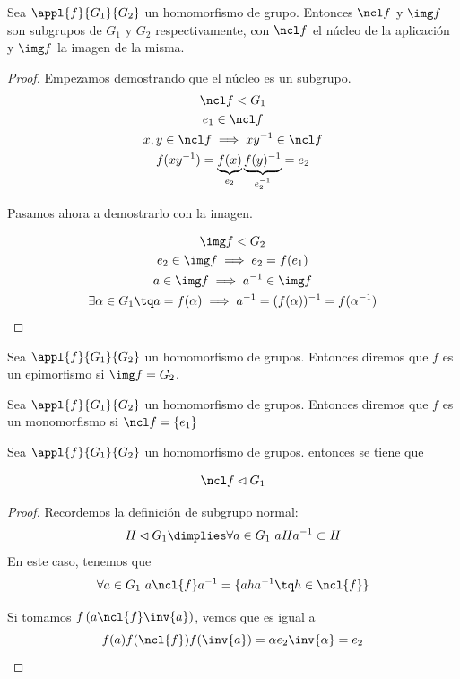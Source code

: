 \documentclass[a4paper,10pt]{apuntes}
\begin{document}
\begin{theorem}
 Sea $\appl{f}{G_1}{G_2}$ un homomorfismo de grupo. Entonces $\ncl f$ y $\img f$ son subgrupos de $G_1$ y $G_2$ respectivamente, con $\ncl f$ el núcleo de la aplicación y $\img f$ la imagen de la misma.
 \end{theorem}
 
 \begin{proof} Empezamos demostrando que el núcleo es un subgrupo.
 \begin{gather*}
  \ncl f < G_1 \\
 e_1 \in \ncl f \\
 x, y \in \ncl f \implies xy^{-1}\in \ncl f \\
 f(xy^{-1}) = \underbrace{f(x)}_{e_2} \underbrace{f(y)^{-1}}_{e_2^{-1}} = e_2
 \end{gather*}
 
Pasamos ahora a demostrarlo con la imagen.

\begin{gather*}
\img f < G_2 \\
 e_2\in \img f \implies e_2 = f(e_1)\\
 a\in \img f \implies a^{-1}\in \img f\\
 \exists \alpha \in G_1 \tq a=f(\alpha ) \implies a^{-1} = (f(\alpha ))^{-1} = f(\alpha ^{-1})
 \end{gather*}
 
 \end{proof}

\begin{defn}[Epimorfismo]
Sea $\appl{f}{G_1}{G_2}$ un homomorfismo de grupos. Entonces diremos que $f$ es un epimorfismo si $\img f = G_2$.
\end{defn}

\begin{defn}[Monomorfismo]
Sea $\appl{f}{G_1}{G_2}$ un homomorfismo de grupos. Entonces diremos que $f$ es un monomorfismo si $\ncl f = \{ e_1\} $
\end{defn}

\begin{lemma} Sea $\appl{f}{G_1}{G_2}$ un homomorfismo de grupos. entonces se tiene que

\[ \ncl f \lhd G_1 \]
\end{lemma}

\begin{proof} Recordemos la definición de subgrupo normal:
\[ H \lhd G_1 \dimplies \forall a\in G_1\ aHa^{-1}\subset H \]
En este caso, tenemos que
\[ \forall a\in G_1\ a\ncl{f}a^{-1} = \{aha^{-1} \tq h\in \ncl{f} \} \]

Si tomamos $f\left(a\ncl{f}\inv{a}\right)$, vemos que es igual a \[ f(a) f(\ncl{f}) f(\inv{a}) = \alpha e_2 \inv{\alpha} = e_2 \]
\end{proof}
\end{document}
